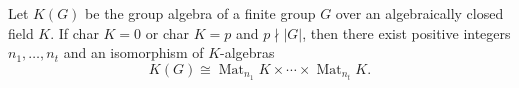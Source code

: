 Let $K(G)$ be the group algebra of a finite group $G$ over an algebraically closed field $K$. If char $K = 0$ or char $K = p$ and $p \nmid |G|$, then there exist positive integers $n_1, \ldots, n_t$ and an isomorphism of $K$-algebras
$$K(G) \cong \operatorname{Mat}_{n_1}K \times \cdots \times \operatorname{Mat}_{n_t}K.$$
